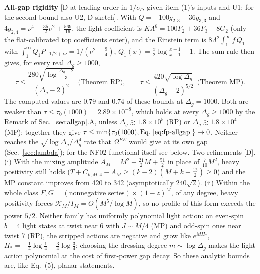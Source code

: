 \textbf{All-gap rigidity} [D at leading order in $1/c_T$, given item (1)'s inputs and U1; for the second bound also U2, D-sketch].
With $Q=-100g_{2,3}-36g_{3,3}$ and $4g_{2,4}=\nu^4-\frac{35}2\nu^2+\frac{569}{16}$, the light coefficient is
$K\Lambda^6=100F_2+36F_3+8G_2$ (only the flat-calibrated top coefficients enter), and the Einstein term is $8\Lambda^2\int_1^\infty f\,Q_1$
with $\int_1^\infty Q_1P_{-1/2+i\nu}=1/(\nu^2+\frac94)$, $Q_1(x)=\frac x2\log\frac{x+1}{x-1}-1$. The sum rule then gives, for every real
$\Delta_g\ge1000$,
\begin{equation}
\tau\le\frac{280\sqrt{\log\frac{\Delta_g+2}3}}{(\Delta_g-2)^2}\ \ \text{(Theorem RP)},\qquad
\tau\le\frac{420\sqrt{\log\Delta_g}}{(\Delta_g-2)^{5/2}}\ \ \text{(Theorem MP)}.
\label{eq:fp-allgap}
\end{equation}
The computed values are $0.79$ and $0.74$ of these bounds at $\Delta_g=1000$. Both are weaker than $\tau\le\tau_0(1000)=2.89\times10^{-8}$,
which holds at every $\Delta_g\ge1000$ by the Remark of Sec.~\ref{sec:allgap}.A, unless $\Delta_g\gtrsim1.8\times10^5$ (RP) or
$\Delta_g\gtrsim1.8\times10^4$ (MP); together they give $\tau\le\min\{\tau_0(1000),\text{Eq.~\eqref{eq:fp-allgap}}\}\to0$. Neither reaches the
$\sqrt{\log\Delta_g}/\Delta_g^4$ rate that $\Omega^{EE}$ would give at its own gap (Sec.~\ref{sec:lambda}); for the NF02 functional itself see below. Two refinements [D]. (i) With the mixing amplitude $A_M=M^2+\tfrac{21}2M+\tfrac{51}2$ in place of $\tfrac7{10}M^2$, heavy positivity
still holds ($T+C_{k,M,4}-A_M\ge(k-2)(M+k+\tfrac{13}2)\ge0$) and the MP constant improves from 420 to 342 (asymptotically $240\sqrt2$). (ii) Within the
whole class $F,G=(\text{nonnegative series})\times(1-z)^M$, of any degree, heavy positivity forces $\mathcal K_M/I_M=O(M^5/\log M)$, so no profile of this
form exceeds the power $5/2$. Neither family has uniformly polynomial light action: on even-spin $b=4$ light states at twist near 6 with $J\sim M/4$
(MP) and odd-spin ones near twist 7 (RP), the stripped actions are negative and grow like $e^{MH_*}$, $H_*=-\tfrac14\log\tfrac14-\tfrac34\log\tfrac34$;
choosing the dressing degree $m\sim\log\Delta_g$ makes the light action polynomial at the cost of first-power gap decay. So these analytic bounds are,
like Eq.~(5), planar statements.


